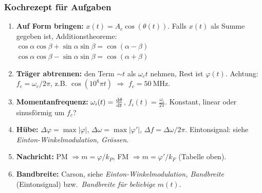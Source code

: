 \subsubsection{Kochrezept für Aufgaben}
\begin{enumerate}
	\setlength{\itemsep}{1pt}
	\item \textbf{Auf Form bringen:} $x(t) = A_c\cos(\theta(t))$. Falls $x(t)$ als Summe gegeben ist, Additionstheoreme:\\
	$\cos\alpha\cos\beta + \sin\alpha\sin\beta = \cos(\alpha-\beta)$ \qquad $\cos\alpha\cos\beta - \sin\alpha\sin\beta = \cos(\alpha+\beta)$
	\item \textbf{Träger abtrennen:} den Term $\sim t$ als $\omega_c t$ nehmen, Rest ist $\varphi(t)$. Achtung: $f_c = \omega_c / 2\pi$, z.B. $\cos(10^8\pi t)$ $\Rightarrow$ $f_c = \qty{50}{\MHz}$.
	\item \textbf{Momentanfrequenz:} $\omega_i(t) = \frac{\mathop{}\!\mathrm{d}\theta}{\mathop{}\!\mathrm{d} t}$, \; $f_i(t) = \frac{\omega_i}{2\pi}$. Konstant, linear oder sinusförmig um $f_c$?
	\item \textbf{Hübe:} $\Delta\varphi = \max|\varphi|$, \; $\Delta\omega = \max|\varphi'|$, \; $\Delta f = \Delta\omega/2\pi$. Eintonsignal: siehe \emph{Einton-Winkelmodulation, Grössen}.
	\item \textbf{Nachricht:} PM $\Rightarrow m = \varphi/k_P$, \; FM $\Rightarrow m = \varphi'/k_F$ (Tabelle oben).
	\item \textbf{Bandbreite:} Carson, siehe \emph{Einton-Winkelmodulation, Bandbreite} (Eintonsignal) bzw.\ \emph{Bandbreite für beliebige $m(t)$}.
\end{enumerate}


